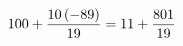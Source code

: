 \documentclass[preview]{standalone}
\begin{document}
\begin{align*}
\special{dvisvgm:raw <g id='unique000'>}100 + \frac{10 \left(-89\right)}{19} = 11 + \frac{801}{19}\special{dvisvgm:raw </g>}
\end{align*}
\end{document}
